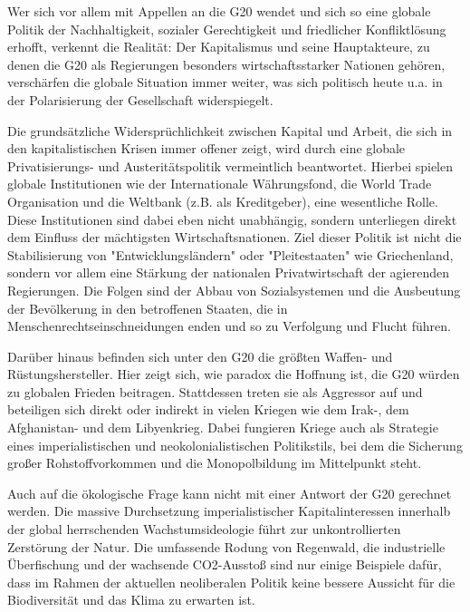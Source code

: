 \documentclass[ngerman,headheight=70pt]{scrartcl}
\begin{document}
    Wer sich vor allem mit Appellen an die G20 wendet und sich so eine globale
    Politik der Nachhaltigkeit, sozialer Gerechtigkeit und friedlicher
    Konfliktlösung erhofft, verkennt die Realität: Der Kapitalismus und seine
    Hauptakteure, zu denen die G20 als Regierungen besonders wirtschaftsstarker
    Nationen gehören, verschärfen die globale Situation immer weiter, was sich
    politisch heute u.a. in der Polarisierung der Gesellschaft widerspiegelt.

    Die grundsätzliche Widersprüchlichkeit zwischen Kapital und Arbeit, die sich
    in den kapitalistischen Krisen immer offener zeigt, wird durch eine globale
    Privatisierungs- und Austeritätspolitik vermeintlich beantwortet. Hierbei
    spielen globale Institutionen wie der Internationale Währungsfond, die World
    Trade Organisation und die Weltbank (z.B. als Kreditgeber), eine wesentliche
    Rolle. Diese Institutionen sind dabei eben nicht unabhängig, sondern
    unterliegen direkt dem Einfluss der mächtigsten Wirtschaftsnationen. Ziel
    dieser Politik ist nicht die Stabilisierung von "Entwicklungsländern" oder
    "Pleitestaaten" wie Griechenland, sondern vor allem eine Stärkung der
    nationalen Privatwirtschaft der agierenden Regierungen. Die Folgen sind der
    Abbau von Sozialsystemen und die Ausbeutung der Bevölkerung in den betroffenen
    Staaten, die in Menschenrechtseinschneidungen enden und so zu Verfolgung und
    Flucht führen.

    Darüber hinaus befinden sich unter den G20 die größten Waffen- und
    Rüstungshersteller. Hier zeigt sich, wie paradox die Hoffnung ist, die G20
    würden zu globalen Frieden beitragen. Stattdessen treten sie als Aggressor
    auf und beteiligen sich direkt oder indirekt in vielen Kriegen wie dem Irak-,
    dem Afghanistan- und dem Libyenkrieg. Dabei fungieren Kriege auch als
    Strategie eines imperialistischen und neokolonialistischen Politikstils, bei
    dem die Sicherung großer Rohstoffvorkommen und die Monopolbildung im
    Mittelpunkt steht.

    Auch auf die ökologische Frage kann nicht mit einer Antwort der G20 gerechnet
    werden. Die massive Durchsetzung imperialistischer Kapitalinteressen
    innerhalb der global herrschenden Wachstumsideologie führt zur
    unkontrollierten Zerstörung der Natur. Die umfassende Rodung von Regenwald,
    die industrielle Überfischung und der wachsende CO2-Ausstoß sind nur einige
    Beispiele dafür, dass im Rahmen der aktuellen neoliberalen Politik keine
    bessere Aussicht für die Biodiversität und das Klima zu erwarten ist.
\end{document}
